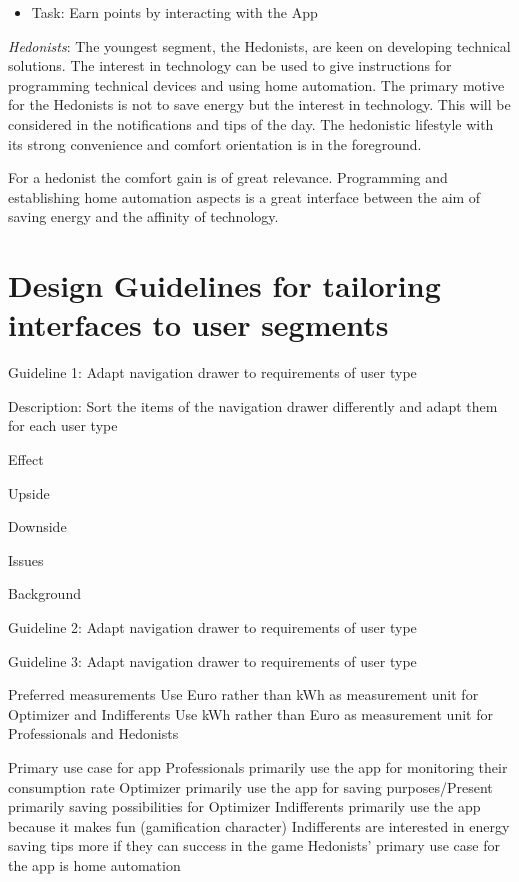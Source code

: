 \begin{enumerate}
	\begin{itemize}
		\item Task: Earn points by interacting with the App
	\end{itemize}
	
	\textit{Hedonists}:
	The youngest segment, the Hedonists, are keen on developing technical solutions. The interest in technology can be used to give instructions for programming technical devices and using home automation. The primary motive for the Hedonists is not to save energy but the interest in technology. This will be considered in the notifications and tips of the day. The hedonistic lifestyle with its strong convenience and comfort orientation is in the foreground.
	
	For a hedonist the comfort gain is of great relevance. Programming and establishing home automation aspects is a great interface between the aim of saving energy and the affinity of technology.
	
	
\end{enumerate}

\section{Design Guidelines for tailoring interfaces to user segments}

Guideline 1: Adapt navigation drawer to requirements of user type

Description: Sort the items of the navigation drawer differently and adapt them for each user type

Effect

Upside

Downside

Issues

Background

Guideline 2: Adapt navigation drawer to requirements of user type

Guideline 3: Adapt navigation drawer to requirements of user type

Preferred measurements
	Use Euro rather than kWh as measurement unit for Optimizer and Indifferents
	Use kWh rather than Euro as measurement unit for Professionals and Hedonists


Primary use case for app
	Professionals primarily use the app for monitoring their consumption rate
	Optimizer primarily use the app for saving purposes/Present primarily saving possibilities for Optimizer
	Indifferents primarily use the app because it makes fun (gamification character) Indifferents are interested in energy saving tips more if they can success in the game
	Hedonists' primary use case for the app is home automation

